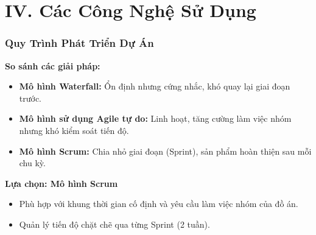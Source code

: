 \section{IV. Các Công Nghệ Sử Dụng}
\begin{frame}
\frametitle{Quy Trình Phát Triển Dự Án}
\textbf{So sánh các giải pháp:}
\begin{itemize}
    \item \textbf{Mô hình Waterfall:} Ổn định nhưng cứng nhắc, khó quay lại giai đoạn trước.
    \item \textbf{Mô hình sử dụng Agile tự do:} Linh hoạt, tăng cường làm việc nhóm nhưng khó kiểm soát tiến độ.
    \item \textbf{Mô hình Scrum:} Chia nhỏ giai đoạn (Sprint), sản phẩm hoàn thiện sau mỗi chu kỳ.
\end{itemize}
\vspace{0.5cm}
\textbf{Lựa chọn: Mô hình Scrum}
\begin{itemize}
    \item Phù hợp với khung thời gian cố định và yêu cầu làm việc nhóm của đồ án.
    \item Quản lý tiến độ chặt chẽ qua từng Sprint (2 tuần).
\end{itemize}
\end{frame}

